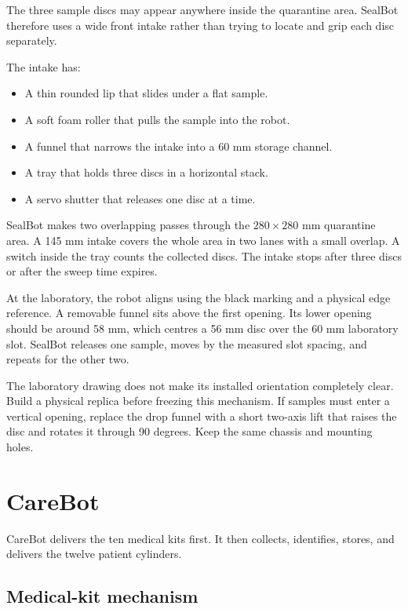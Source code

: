\documentclass[11pt,a4paper]{article}
\begin{document}
The three sample discs may appear anywhere inside the quarantine area. SealBot therefore uses a wide front intake rather than trying to locate and grip each disc separately.

The intake has:

\begin{itemize}
  \item A thin rounded lip that slides under a flat sample.
  \item A soft foam roller that pulls the sample into the robot.
  \item A funnel that narrows the intake into a 60 mm storage channel.
  \item A tray that holds three discs in a horizontal stack.
  \item A servo shutter that releases one disc at a time.
\end{itemize}

SealBot makes two overlapping passes through the $280 \times 280$ mm quarantine area. A 145 mm intake covers the whole area in two lanes with a small overlap. A switch inside the tray counts the collected discs. The intake stops after three discs or after the sweep time expires.

At the laboratory, the robot aligns using the black marking and a physical edge reference. A removable funnel sits above the first opening. Its lower opening should be around 58 mm, which centres a 56 mm disc over the 60 mm laboratory slot. SealBot releases one sample, moves by the measured slot spacing, and repeats for the other two.

The laboratory drawing does not make its installed orientation completely clear. Build a physical replica before freezing this mechanism. If samples must enter a vertical opening, replace the drop funnel with a short two-axis lift that raises the disc and rotates it through 90 degrees. Keep the same chassis and mounting holes.

\section{CareBot}

CareBot delivers the ten medical kits first. It then collects, identifies, stores, and delivers the twelve patient cylinders.

\subsection{Medical-kit mechanism}
\end{document}
